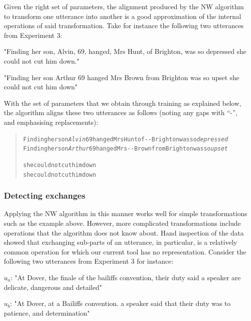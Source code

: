 Given the right set of parameters, the alignment produced by the NW
algorithm to transform one utterance into another is a good
approximation of the internal operations of said transformation. Take
for instance the following two utterances from Experiment 3:

\begin{nquote} %
  "Finding her son, Alvin, 69, hanged, Mrs Hunt, of Brighton, was so depressed she could not cut him down."
\end{nquote}\begin{nquote} %
  "Finding her son Arthur 69 hanged Mrs Brown from Brighton was so upset she could not cut him down"
\end{nquote}

With the set of parameters that we obtain through training as explained
below, the algorithm aligns these two utterances as follows (noting any
gaps with \enquote{-}, and emphasising replacements):

\begin{quote}\begin{alltt}\small
Finding her son \emph{\textcolor{Sepia}{Alvin}}  69 hanged Mrs \textcolor{BrickRed}{Hunt of} -     -    Brighton was so \emph{\textcolor{Sepia}{depressed}}
Finding her son \emph{\textcolor{Sepia}{Arthur}} 69 hanged Mrs -    -  \textcolor{OliveGreen}{Brown from} Brighton was so \emph{\textcolor{Sepia}{upset}}

she could not cut him down
she could not cut him down
\end{alltt}\end{quote}

\subsubsection{Detecting exchanges}\label{detecting-exchanges}

Applying the NW algorithm in this manner works well for simple
transformations such as the example above. However, more complicated
transformations include operations that the algorithm does not know
about. Hand inspection of the data showed that exchanging sub-parts of
an utterance, in particular, is a relatively common operation for which
our current tool has no representation. Consider the following two
utterances from Experiment 3 for instance:

\begin{nquote} %
  $u_a$: "At Dover, the finale of the bailiffs convention, their duty said a speaker are delicate, dangerous and detailed" \label{ut:49}
\end{nquote}\begin{nquote} %
  $u_b$: "At Dover, at a Bailiffs convention. a speaker said that their duty was to patience, and determination" \label{ut:120}
\end{nquote}

